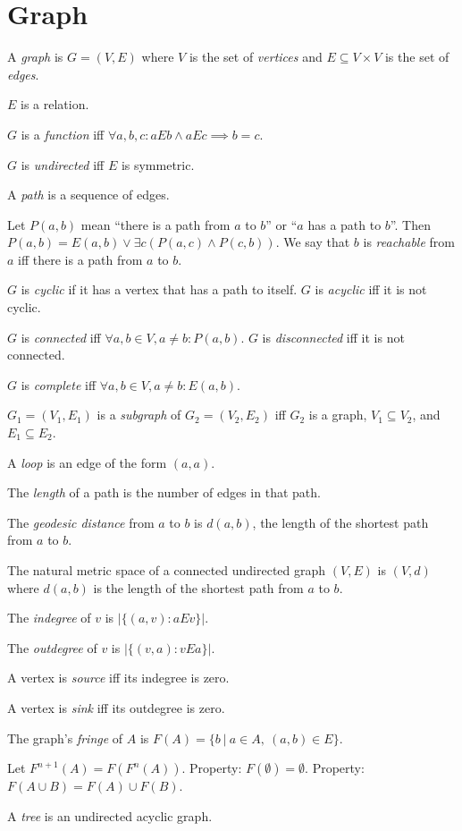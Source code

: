 \chapter{Graph}

A \emph{graph} is \(G = (V,E)\) where
\(V\) is the set of \emph{vertices} and \(E \subseteq V \times V\) is the set of \emph{edges}.

\(E\) is a relation.

\(G\) is a \emph{function} iff \(\forall a, b, c : a E b \wedge a E c \implies b=c\).

\(G\) is \emph{undirected} iff \(E\) is symmetric.

A \emph{path} is a sequence of edges.

Let \(P(a,b)\) mean ``there is a path from \(a\) to \(b\)'' or ``\(a\) has a path to \(b\)''.
Then \(P(a,b) = E(a,b) \vee \exists c (P(a,c) \wedge P(c,b))\).
We say that \(b\) is \emph{reachable} from \(a\) iff there is a path from \(a\) to \(b\).

\(G\) is \emph{cyclic} if it has a vertex that has a path to itself.
\(G\) is \emph{acyclic} iff it is not cyclic.

\(G\) is \emph{connected} iff \(\forall a,b \in V, a\neq b : P(a,b)\).
\(G\) is \emph{disconnected} iff it is not connected.

\(G\) is \emph{complete} iff \(\forall a,b \in V, a \neq b : E(a,b)\).

\(G_1 = (V_1,E_1)\) is a \emph{subgraph} of \(G_2 = (V_2,E_2)\)
iff \(G_2\) is a graph, \(V_1 \subseteq V_2\), and \(E_1 \subseteq E_2\).

A \emph{loop} is an edge of the form \((a,a)\).

The \emph{length} of a path is the number of edges in that path.


The \emph{geodesic distance} from \(a\) to \(b\) is \(d(a,b)\),
the length of the shortest path from \(a\) to \(b\).

The natural metric space of a connected undirected graph \((V,E)\) is \((V,d)\) where
\(d(a,b)\) is the length of the shortest path from \(a\) to \(b\).

The \emph{indegree} of \(v\) is \(|\{ (a,v) : a E v \}|\).

The \emph{outdegree} of \(v\) is \(|\{ (v,a) : v E a \}|\).

A vertex is \emph{source} iff its indegree is zero.

A vertex is \emph{sink} iff its outdegree is zero.

The graph's \emph{fringe} of \(A\) is \(F(A) = \{ b ~|~ a \in A, ~ (a,b) \in E \}\).

Let \(F^{n+1}(A) = F(F^n(A))\).
Property: \(F(\emptyset) = \emptyset\).
Property: \(F(A \cup B) = F(A) \cup F(B)\).

A \emph{tree} is an undirected acyclic graph.
